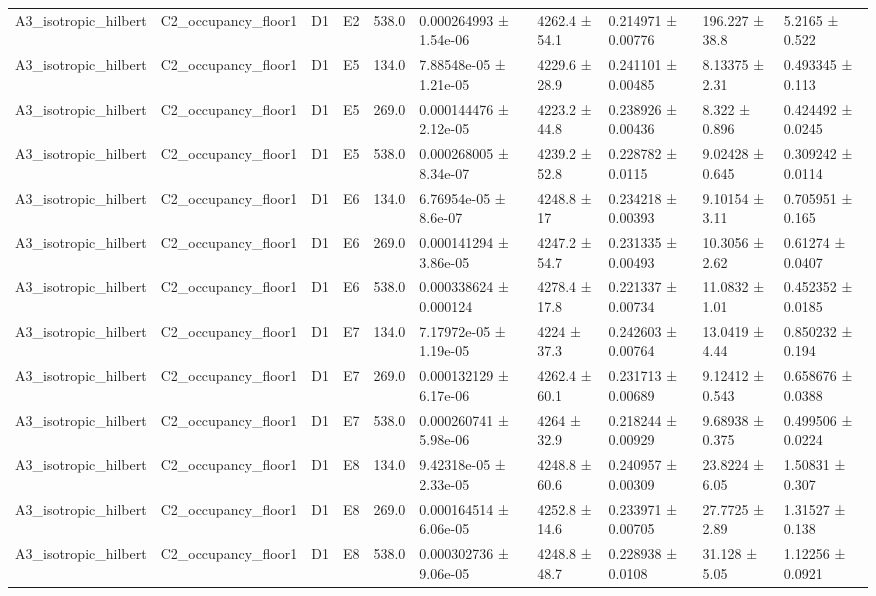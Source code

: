 \begin{table}
\begin{tabular}{llllllllll}
A3\_isotropic\_hilbert & C2\_occupancy\_floor1 & D1 & E2 & 538.0 & 0.000264993 ± 1.54e-06 & 4262.4 ± 54.1 & 0.214971 ± 0.00776 & 196.227 ± 38.8 & 5.2165 ± 0.522 \\
A3\_isotropic\_hilbert & C2\_occupancy\_floor1 & D1 & E5 & 134.0 & 7.88548e-05 ± 1.21e-05 & 4229.6 ± 28.9 & 0.241101 ± 0.00485 & 8.13375 ± 2.31 & 0.493345 ± 0.113 \\
A3\_isotropic\_hilbert & C2\_occupancy\_floor1 & D1 & E5 & 269.0 & 0.000144476 ± 2.12e-05 & 4223.2 ± 44.8 & 0.238926 ± 0.00436 & 8.322 ± 0.896 & 0.424492 ± 0.0245 \\
A3\_isotropic\_hilbert & C2\_occupancy\_floor1 & D1 & E5 & 538.0 & 0.000268005 ± 8.34e-07 & 4239.2 ± 52.8 & 0.228782 ± 0.0115 & 9.02428 ± 0.645 & 0.309242 ± 0.0114 \\
A3\_isotropic\_hilbert & C2\_occupancy\_floor1 & D1 & E6 & 134.0 & 6.76954e-05 ± 8.6e-07 & 4248.8 ± 17 & 0.234218 ± 0.00393 & 9.10154 ± 3.11 & 0.705951 ± 0.165 \\
A3\_isotropic\_hilbert & C2\_occupancy\_floor1 & D1 & E6 & 269.0 & 0.000141294 ± 3.86e-05 & 4247.2 ± 54.7 & 0.231335 ± 0.00493 & 10.3056 ± 2.62 & 0.61274 ± 0.0407 \\
A3\_isotropic\_hilbert & C2\_occupancy\_floor1 & D1 & E6 & 538.0 & 0.000338624 ± 0.000124 & 4278.4 ± 17.8 & 0.221337 ± 0.00734 & 11.0832 ± 1.01 & 0.452352 ± 0.0185 \\
A3\_isotropic\_hilbert & C2\_occupancy\_floor1 & D1 & E7 & 134.0 & 7.17972e-05 ± 1.19e-05 & 4224 ± 37.3 & 0.242603 ± 0.00764 & 13.0419 ± 4.44 & 0.850232 ± 0.194 \\
A3\_isotropic\_hilbert & C2\_occupancy\_floor1 & D1 & E7 & 269.0 & 0.000132129 ± 6.17e-06 & 4262.4 ± 60.1 & 0.231713 ± 0.00689 & 9.12412 ± 0.543 & 0.658676 ± 0.0388 \\
A3\_isotropic\_hilbert & C2\_occupancy\_floor1 & D1 & E7 & 538.0 & 0.000260741 ± 5.98e-06 & 4264 ± 32.9 & 0.218244 ± 0.00929 & 9.68938 ± 0.375 & 0.499506 ± 0.0224 \\
A3\_isotropic\_hilbert & C2\_occupancy\_floor1 & D1 & E8 & 134.0 & 9.42318e-05 ± 2.33e-05 & 4248.8 ± 60.6 & 0.240957 ± 0.00309 & 23.8224 ± 6.05 & 1.50831 ± 0.307 \\
A3\_isotropic\_hilbert & C2\_occupancy\_floor1 & D1 & E8 & 269.0 & 0.000164514 ± 6.06e-05 & 4252.8 ± 14.6 & 0.233971 ± 0.00705 & 27.7725 ± 2.89 & 1.31527 ± 0.138 \\
A3\_isotropic\_hilbert & C2\_occupancy\_floor1 & D1 & E8 & 538.0 & 0.000302736 ± 9.06e-05 & 4248.8 ± 48.7 & 0.228938 ± 0.0108 & 31.128 ± 5.05 & 1.12256 ± 0.0921 \\

\end{tabular}
\end{table}
